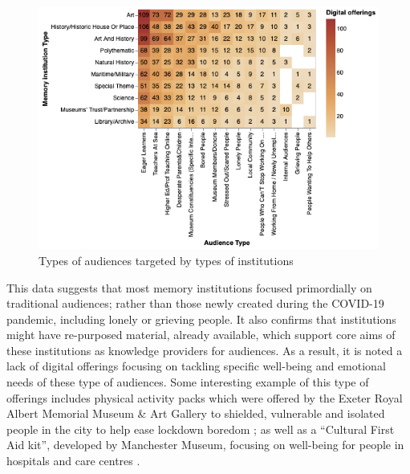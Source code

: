 \documentclass{egpubl}
\begin{document}
\begin{figure}[h]
  \centering
  \includegraphics[width=\linewidth]{images/audiencesboth.png}
  \caption{\label{fig:MTypeAudiences}
           Types of audiences targeted by types of institutions }
\end{figure}



This data suggests that most memory institutions focused primordially on traditional audiences;  rather than those newly created during the COVID-19 pandemic, including lonely or grieving people. It also confirms that institutions might have re-purposed material, already available, which support core aims of these institutions as knowledge providers for audiences. As a result, it is noted a lack of digital offerings focusing on tackling specific well-being and emotional needs of these type of audiences. Some interesting example  of this  type of offerings includes physical activity packs which were offered by the Exeter Royal Albert Memorial Museum \& Art Gallery to shielded, vulnerable and isolated people in the city to help ease lockdown boredom \cite{ex2020}; as well as a ``Cultural First Aid kit'', developed by Manchester Museum, focusing on well-being for people in hospitals and care centres \cite{man2020}. 


\end{document}
